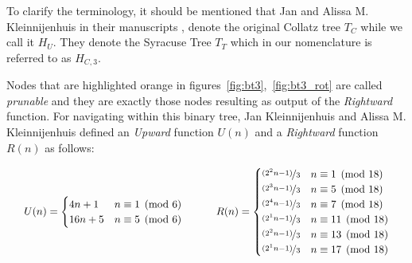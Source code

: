 \begin{remark}
	To clarify the terminology, it should be mentioned that Jan and Alissa M. Kleinnijenhuis in their manuscripts \cite{Ref_Kleinnijenhuis_2020a}, \cite{Ref_Kleinnijenhuis_2020b} denote the original Collatz tree $T_C$ while we call it $H_U$. They denote the Syracuse Tree $T_T$ which in our nomenclature is referred to as $H_{C,3}$.
\end{remark}

Nodes that are highlighted orange in figures~\ref{fig:bt3},~\ref{fig:bt3_rot} are called \textit{prunable} and they are exactly those nodes resulting as output of the \textit{Rightward} function. For navigating within this binary tree, Jan Kleinnijenhuis and Alissa M. Kleinnijenhuis \cite{Ref_Kleinnijenhuis_2020a} defined an \textit{Upward} function $U(n)$ and a \textit{Rightward} function $R(n)$ as follows:

\begin{equation}
\label{eq:bintree_3_rightward_upward}
\setlength{\arraycolsep}{1.6em}
\begin{array}{cc}
U(n)=\begin{cases}
        4n+1	&	n\equiv 1\pmod 6\\
        16n+5	&	n\equiv 5\pmod 6
    \end{cases} &
R(n)=\begin{cases}
    \nicefrac{(2^2n-1)}{3}	&	n\equiv 1\pmod{18}\\
    \nicefrac{(2^3n-1)}{3}	&	n\equiv 5\pmod{18}\\
    \nicefrac{(2^4n-1)}{3}	&	n\equiv 7\pmod{18}\\
    \nicefrac{(2^1n-1)}{3}	&	n\equiv 11\pmod{18}\\
    \nicefrac{(2^2n-1)}{3}	&	n\equiv 13\pmod{18}\\
    \nicefrac{(2^1n-1)}{3}	&	n\equiv 17\pmod{18}
\end{cases}
\end{array}
\end{equation}

